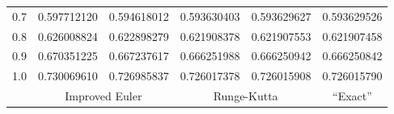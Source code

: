 \begin{examplesolution}
\begin{newtable}
\begin{center}
\begin{tabular}{|c|r|r|r|r|r|}
      0.7                       & 0.597712120                         & 0.594618012                      & 0.593630403                   & 0.593629627                    & 0.593629526                     \\
      0.8                       & 0.626008824                         & 0.622898279                      & 0.621908378                   & 0.621907553                    & 0.621907458                     \\
      0.9                       & 0.670351225                         & 0.667237617                      & 0.666251988                   & 0.666250942                    & 0.666250842                     \\
      1.0                       & 0.730069610                         & 0.726985837                      & 0.726017378                   & 0.726015908                    & 0.726015790                     \\
      \hline
                                & \multicolumn{2}{c|}{Improved Euler} & \multicolumn{2}{c|}{Runge-Kutta} & \multicolumn{1}{c|}{``Exact''} \\
      \hline
    \end{tabular}
  \end{center}
\end{newtable}
\end{examplesolution}

